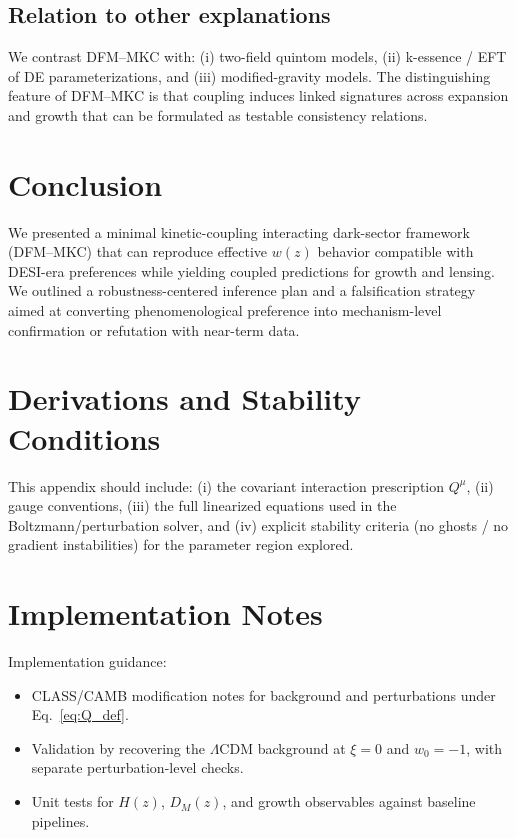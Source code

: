 \documentclass[11pt]{article}
\newcommand{\LCDM}{\ensuremath{\Lambda\mathrm{CDM}}\xspace}
\newcommand{\wz}{\ensuremath{w(z)}\xspace}
\begin{document}
\subsection{Relation to other explanations}

We contrast DFM--MKC with:
(i) two-field quintom models, (ii) k-essence / EFT of DE parameterizations, and (iii) modified-gravity models.
The distinguishing feature of DFM--MKC is that coupling induces linked signatures across expansion and growth that can be formulated as testable consistency relations.

\section{Conclusion}
\label{sec:conclusion}

We presented a minimal kinetic-coupling interacting dark-sector framework (DFM--MKC) that can reproduce effective \wz behavior compatible with DESI-era preferences while yielding coupled predictions for growth and lensing.
We outlined a robustness-centered inference plan and a falsification strategy aimed at converting phenomenological preference into mechanism-level confirmation or refutation with near-term data.

\appendix

\section{Derivations and Stability Conditions}
\label{app:stability}

This appendix should include:
(i) the covariant interaction prescription $Q^\mu$, (ii) gauge conventions, (iii) the full linearized equations used in the Boltzmann/perturbation solver,
and (iv) explicit stability criteria (no ghosts / no gradient instabilities) for the parameter region explored.

\section{Implementation Notes}
\label{app:implementation}

Implementation guidance:
\begin{itemize}
\item CLASS/CAMB modification notes for background and perturbations under Eq.~\eqref{eq:Q_def}.
\item Validation by recovering the \LCDM background at $\xi=0$ and $w_0=-1$, with separate perturbation-level checks.
\item Unit tests for $H(z)$, $D_M(z)$, and growth observables against baseline pipelines.
\end{itemize}



\end{document}
